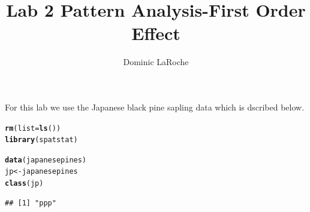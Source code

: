 \documentclass{article}\usepackage[]{graphicx}\usepackage[]{color}
\title{Lab 2 Pattern Analysis-First Order Effect}
\author{Dominic LaRoche}
\makeatletter
\newcommand{\hlstd}[1]{\textcolor[rgb]{0.345,0.345,0.345}{#1}}%
\newcommand{\hlkwb}[1]{\textcolor[rgb]{0.69,0.353,0.396}{#1}}%
\newcommand{\hlkwc}[1]{\textcolor[rgb]{0.333,0.667,0.333}{#1}}%
\newcommand{\hlkwd}[1]{\textcolor[rgb]{0.737,0.353,0.396}{\textbf{#1}}}%
\newenvironment{kframe}{%
 \def\at@end@of@kframe{}%
 \ifinner\ifhmode%
  \def\at@end@of@kframe{\end{minipage}}%
  \begin{minipage}{\columnwidth}%
 \fi\fi%
 \def\FrameCommand##1{\hskip\@totalleftmargin \hskip-\fboxsep
 \colorbox{shadecolor}{##1}\hskip-\fboxsep
     \hskip-\linewidth \hskip-\@totalleftmargin \hskip\columnwidth}%
 \MakeFramed {\advance\hsize-\width
   \@totalleftmargin\z@ \linewidth\hsize
   \@setminipage}}%
 {\par\unskip\endMakeFramed%
 \at@end@of@kframe}
\newenvironment{knitrout}{}{} %
\makeatother
\begin{document}
\maketitle
For this lab we use the Japanese black pine sapling data which is dscribed below.
\begin{knitrout}
\color{fgcolor}\begin{kframe}
\begin{alltt}
\hlkwd{rm}\hlstd{(}\hlkwc{list}\hlstd{=}\hlkwd{ls}\hlstd{())}
\hlkwd{library}\hlstd{(spatstat)}
\end{alltt}


{\ttfamily\noindent\itshape\color{messagecolor}{\#\# \\\#\# spatstat 1.38-1\ \ \ \ \ \  (nickname: 'Le Hardi') \\\#\# For an introduction to spatstat, type 'beginner'}}\begin{alltt}
\hlkwd{data}\hlstd{(japanesepines)}
\hlstd{jp}\hlkwb{<-}\hlstd{japanesepines}
\hlkwd{class}\hlstd{(jp)}
\end{alltt}
\begin{verbatim}
## [1] "ppp"
\end{verbatim}
\end{kframe}
\end{knitrout}
\end{document}
